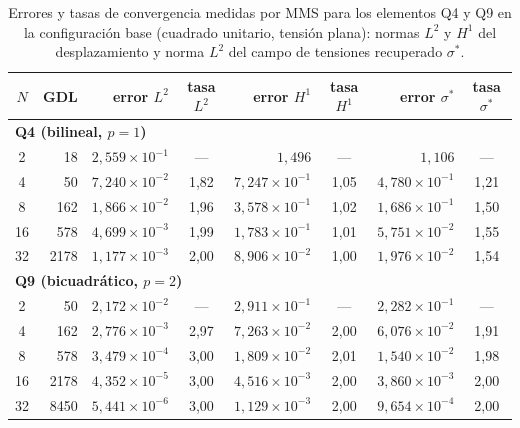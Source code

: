 \begin{table}[htbp]
\centering
\caption[Errores y tasas de convergencia medidas por MMS (configuración base).]{Errores y tasas de convergencia medidas por MMS para los elementos Q4 y Q9 en la configuración base (cuadrado unitario, tensión plana): normas $L^2$ y $H^1$ del desplazamiento y norma $L^2$ del campo de tensiones recuperado $\sigma^*$.}
\label{tab:mms}
\small
\setlength{\tabcolsep}{4pt}
\begin{tabular}{c r r c r c r c}
\hline
$N$ & GDL & error $L^2$ & tasa $L^2$ & error $H^1$ & tasa $H^1$ & error $\sigma^*$ & tasa $\sigma^*$ \\
\hline
\multicolumn{8}{l}{\textbf{Q4 (bilineal, $p=1$)}} \\
2  & 18   & $2{,}559\times10^{-1}$ & ---  & $1{,}496$               & ---  & $1{,}106$              & ---  \\
4  & 50   & $7{,}240\times10^{-2}$ & 1,82 & $7{,}247\times10^{-1}$  & 1,05 & $4{,}780\times10^{-1}$ & 1,21 \\
8  & 162  & $1{,}866\times10^{-2}$ & 1,96 & $3{,}578\times10^{-1}$  & 1,02 & $1{,}686\times10^{-1}$ & 1,50 \\
16 & 578  & $4{,}699\times10^{-3}$ & 1,99 & $1{,}783\times10^{-1}$  & 1,01 & $5{,}751\times10^{-2}$ & 1,55 \\
32 & 2178 & $1{,}177\times10^{-3}$ & 2,00 & $8{,}906\times10^{-2}$  & 1,00 & $1{,}976\times10^{-2}$ & 1,54 \\
\hline
\multicolumn{8}{l}{\textbf{Q9 (bicuadrático, $p=2$)}} \\
2  & 50   & $2{,}172\times10^{-2}$ & ---  & $2{,}911\times10^{-1}$  & ---  & $2{,}282\times10^{-1}$ & ---  \\
4  & 162  & $2{,}776\times10^{-3}$ & 2,97 & $7{,}263\times10^{-2}$  & 2,00 & $6{,}076\times10^{-2}$ & 1,91 \\
8  & 578  & $3{,}479\times10^{-4}$ & 3,00 & $1{,}809\times10^{-2}$  & 2,01 & $1{,}540\times10^{-2}$ & 1,98 \\
16 & 2178 & $4{,}352\times10^{-5}$ & 3,00 & $4{,}516\times10^{-3}$  & 2,00 & $3{,}860\times10^{-3}$ & 2,00 \\
32 & 8450 & $5{,}441\times10^{-6}$ & 3,00 & $1{,}129\times10^{-3}$  & 2,00 & $9{,}654\times10^{-4}$ & 2,00 \\
\hline
\end{tabular}
\end{table}

